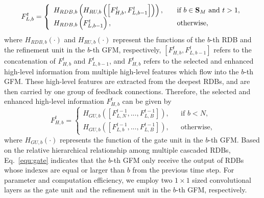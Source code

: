\documentclass{bmvc2k}
\begin{document}
\begin{equation}
F_{L,b}^{t}=\left\{
\begin{array}{lcl}
H_{RDB,b}\left(H_{RU,b}\left ( \left [ F_{H,b}^{t},F_{L,b-1}^{t} \right ] \right )\right), & & \text{if $b \in \mathbf{S}_{M}$ and $t>1$},\\
H_{RDB,b}\left(F_{L,b-1}^{t}\right), & & \text{otherwise},
\end{array} \right.
\setlength{\parskip}{0.5\baselineskip}
\label{equ:rdb}
\end{equation}
where $H_{RDB,b}(\cdot)$ and $H_{RU,b}(\cdot)$ represent the functions of the $b$-th RDB and the refinement unit in the $b$-th GFM, respectively, $\left [ F_{H,b}^{t},F_{L,b-1}^{t} \right ]$ refers to the concatenation of $F_{H,b}^{t}$ and $F_{L,b-1}^{t}$, and $F_{H,b}^{t}$ refers to the selected and enhanced high-level information from multiple high-level features which flow into the $b$-th GFM. These high-level features are extracted from the deepest RDBs, and are then carried by one group of feedback connections. Therefore, the selected and enhanced high-level information $F_{H,b}^{t}$ can be given by
\begin{equation}
F_{H,b}^{t}=\left\{
\begin{array}{lcl}
H_{GU,b}\left ( \left [ F_{L,N}^{t-1},...,F_{L,B}^{t-1} \right ] \right ), & & \text{if $b< N$},\\
H_{GU,b}\left ( \left [ F_{L,b}^{t-1},...,F_{L,B}^{t-1} \right ] \right ), & & \text{otherwise},
\end{array} \right.
\label{equ:gate}
\end{equation}
where $H_{GU,b}(\cdot)$ represents the function of the gate unit in the $b$-th GFM. Based on the relative hierarchical relationship among multiple cascaded RDBs, Eq.~\ref{equ:gate} indicates that the $b$-th GFM only receive the output of RDBs whose indexes are equal or larger than $b$ from the previous time step. For parameter and computation efficiency, we employ two $1\times1$ sized convolutional layers as the gate unit and the refinement unit in the $b$-th GFM, respectively. 
\end{document}
